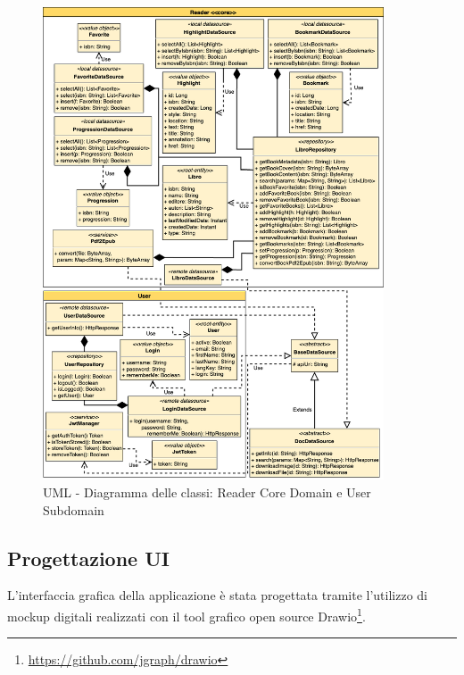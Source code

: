 \begin{figure}[H]
\centering
\includegraphics[width=0.9\textwidth]{img/tesi-25-ddd.drawio.png}
\caption{UML - Diagramma delle classi: Reader Core Domain e User Subdomain}
\label{fig:5.4}
\end{figure}

\subsection{Progettazione UI}

L'interfaccia grafica della applicazione è stata progettata tramite l'utilizzo di mockup digitali realizzati con il tool grafico open source Drawio\footnote{\url{https://github.com/jgraph/drawio}}. 

